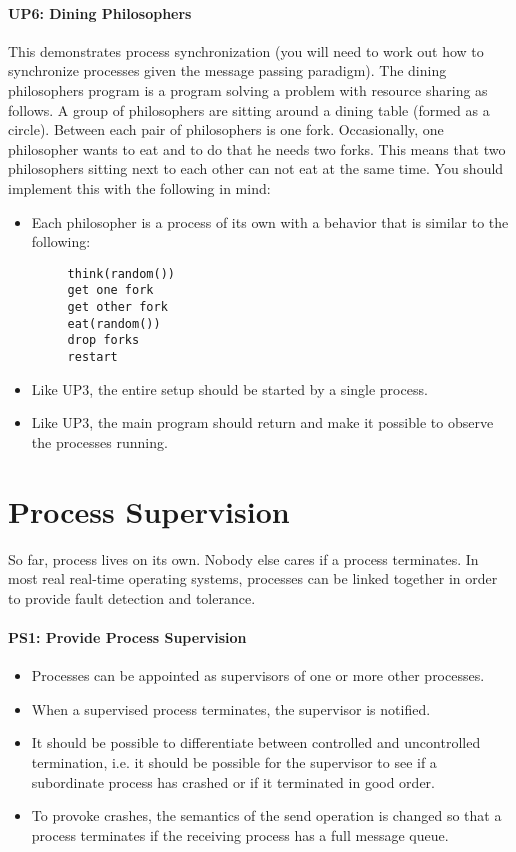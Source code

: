 \paragraph*{UP6: Dining Philosophers}

This demonstrates process synchronization (you will need to work out how to synchronize processes given the message passing paradigm). The dining philosophers program is a program solving a problem with resource sharing as follows. A group of philosophers are sitting around a dining table (formed as a circle). Between each pair of philosophers is one fork. Occasionally, one philosopher wants to eat and to do that he needs two forks. This means that two philosophers sitting next to each other can not eat at the same time. You should implement this with the following in mind:

\begin{itemize}
  \item Each philosopher is a process of its own with a behavior that is similar to the following:
	 \begin{verbatim}
	 think(random())
	 get one fork
	 get other fork
	 eat(random())
	 drop forks
	 restart 
	 \end{verbatim}

  \item Like UP3, the entire setup should be started by a single process.
  \item Like UP3, the main program should return and make it possible to observe the processes running.
\end{itemize}


\section{Process Supervision}

So far, process lives on its own. Nobody else cares if a process terminates. In most real real-time operating systems, processes can be linked together in order to provide fault detection and tolerance.

\paragraph*{PS1: Provide Process Supervision}

\begin{itemize}
  \item Processes can be appointed as supervisors of one or more other processes.
  \item  When a supervised process terminates, the supervisor is notified.
  \item  It should be possible to differentiate between controlled and uncontrolled termination, i.e. it should be possible for the supervisor to see if a subordinate process has crashed or if it terminated in good order.
  \item  To provoke crashes, the semantics of the send operation is changed so that a process terminates if the receiving process has a full message queue.
\end{itemize}

